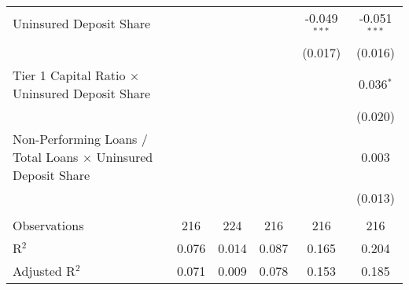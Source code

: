 \begin{table}[htbp]
\begin{adjustbox}{width = 1.2\textwidth, center}
\begin{tabular}{lccccc}
         Uninsured Deposit Share                                              &                &                &                & -0.049$^{***}$ & -0.051$^{***}$\\   
                                                                              &                &                &                & (0.017)        & (0.016)\\   
         Tier 1 Capital Ratio $\times$ Uninsured Deposit Share                &                &                &                &                & 0.036$^{*}$\\   
                                                                              &                &                &                &                & (0.020)\\   
         Non-Performing Loans / Total Loans $\times$ Uninsured Deposit Share  &                &                &                &                & 0.003\\   
                                                                              &                &                &                &                & (0.013)\\   
          \\
         Observations                                                         & 216            & 224            & 216            & 216            & 216\\  
         R$^2$                                                                & 0.076          & 0.014          & 0.087          & 0.165          & 0.204\\  
         Adjusted R$^2$                                                       & 0.071          & 0.009          & 0.078          & 0.153          & 0.185\\  
         \bottomrule
      \end{tabular}
   \end{adjustbox}
\end{table}


